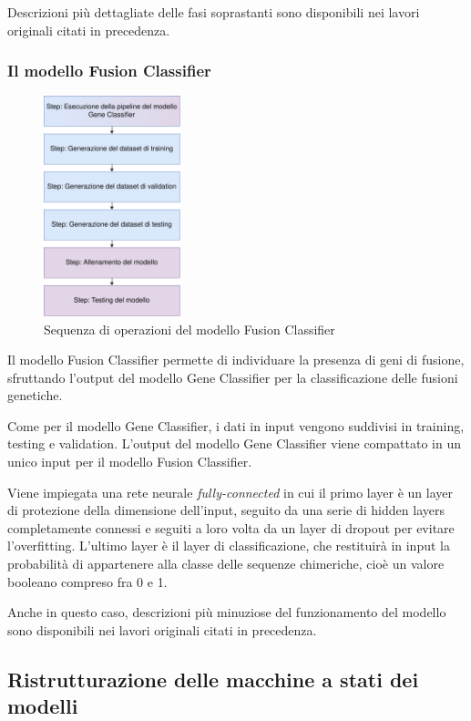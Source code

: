 Descrizioni più dettagliate delle fasi soprastanti sono disponibili nei lavori originali citati in precedenza.

\subsubsection{Il modello Fusion Classifier}
\begin{figure}[h]
    \centering
    \includegraphics[width=150px]{figures/ch2/fusion_stati.png}
    \caption[Sequenza di operazioni del modello Fusion Classifier]{Sequenza di operazioni del modello Fusion Classifier}
    \label{fig:cha2:fusion_stati}
\end{figure}

Il modello Fusion Classifier permette di individuare la presenza di geni di fusione, sfruttando l'output del modello Gene Classifier per la classificazione delle fusioni genetiche.

Come per il modello Gene Classifier, i dati in input vengono suddivisi in training, testing e validation. L'output del modello Gene Classifier viene compattato in un unico input per il modello Fusion Classifier.

Viene impiegata una rete neurale {\em fully-connected} in cui il primo layer è un layer di protezione della dimensione dell'input, seguito da una serie di hidden layers completamente connessi e seguiti a loro volta da un layer di dropout per evitare l'overfitting. L'ultimo layer è il layer di classificazione, che restituirà in input la probabilità di appartenere alla classe delle sequenze chimeriche, cioè un valore booleano compreso fra 0 e 1.

Anche in questo caso, descrizioni più minuziose del funzionamento del modello sono disponibili nei lavori originali citati in precedenza.

\subsection{Ristrutturazione delle macchine a stati dei modelli}

